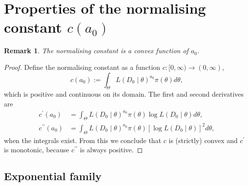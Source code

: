 \documentclass[a4paper, notitlepage, 11pt]{article}
\newtheorem{remark}{Remark}[]
\begin{document}
\section*{Properties of the normalising constant $c(a_0)$}

\begin{remark}
\label{rmk:convex_norm_constant}
 The normalising constant is a convex function of $a_0$.
\end{remark}
\begin{proof}
Define the normalising constant as a function $c : [0, \infty) \to (0, \infty)$,
\begin{equation}
 \label{eq:normconst}
 c(a_0) := \int_{\Theta} L(D_0\mid\theta)^{a_0} \pi(\theta)d\theta,
\end{equation}
which is positive and continuous on its domain.
The first and second derivatives are
\begin{align*}
c^\prime(a_0) &= \int_{\Theta} L(D_0\mid\theta)^{a_0} \pi(\theta) \log L(D_0\mid\theta) d\theta, \\
c^{\prime\prime}(a_0) &= \int_{\Theta} L(D_0\mid\theta)^{a_0} \pi(\theta) [\log L(D_0\mid\theta)]^2 d\theta,
\end{align*}
when the integrals exist.
From this we conclude that $c$ is (strictly) convex and $c^\prime$ is monotonic, because $c^{\prime\prime}$ is always positive.

\end{proof}


\subsection*{Exponential family}
\end{document}

